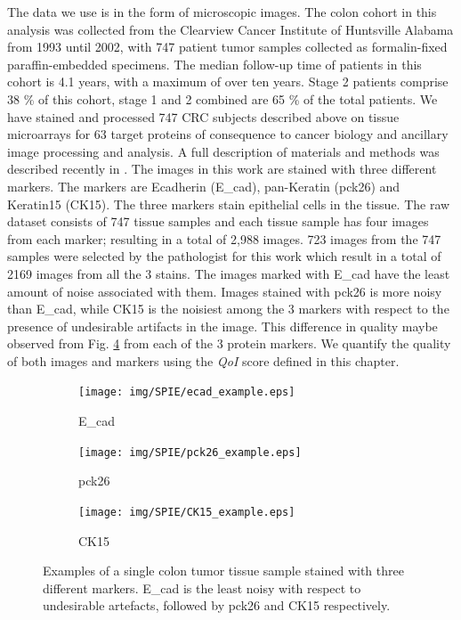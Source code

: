 The data we use is in the form of microscopic images. The colon cohort in this analysis was collected from the Clearview Cancer Institute of Huntsville Alabama from 1993 until 2002, with 747 patient tumor samples collected as formalin-fixed paraffin-embedded specimens. The median follow-up time of patients in this cohort is 4.1 years, with a maximum of over ten years. Stage 2 patients comprise 38 \% of this cohort, stage 1 and 2 combined are 65 \% of the total patients. We have stained and processed 747 CRC subjects described above on tissue microarrays for 63 target proteins of consequence to cancer biology and ancillary image processing and analysis. A full description of materials and methods was described recently in \cite{gerdes2013highly}.
The images in this work are stained with three different markers. The markers are Ecadherin (E\_cad), pan-Keratin (pck26) and Keratin15 (CK15). The three markers stain epithelial cells in the tissue. The raw dataset consists of 747 tissue samples and each tissue sample has four images from each marker; resulting in a total of 2,988 images.  723 images from the 747 samples were selected by the pathologist for this work which result in a total of 2169 images from all the 3 stains.
The images marked with E\_cad have the least amount of noise associated with them. Images stained with pck26 is more noisy than E\_cad, while CK15 is the noisiest among the 3 markers with respect to the presence of undesirable artifacts in the image. This difference in quality maybe observed from Fig. \ref{fig:example_images} from each of the 3 protein markers. We quantify the quality of  both images and markers using the \textit{QoI} score defined in this chapter. 

\begin{figure}
    \centering
    \begin{subfigure}[b]{0.3\textwidth}
        \centering
        \texttt{[image: img/SPIE/ecad\_example.eps]}
        \caption{E\_cad}
        \label{fig:ecad_example}
    \end{subfigure}
    \hfill
    \begin{subfigure}[b]{0.3\textwidth}
        \centering
        \texttt{[image: img/SPIE/pck26\_example.eps]}
        \caption{pck26}
        \label{fig:pck26_example}
    \end{subfigure}
    \hfill
    \begin{subfigure}[b]{0.3\textwidth}
        \centering
        \texttt{[image: img/SPIE/CK15\_example.eps]}
        \caption{CK15}
        \label{fig:CK15_example}
    \end{subfigure}
    \caption{Examples of a single colon tumor tissue sample stained with three different markers. E\_cad is the least noisy with respect to undesirable artefacts, followed by pck26 and CK15 respectively.}
    \label{fig:example_images}
\end{figure}

